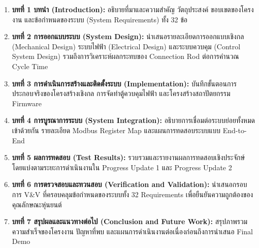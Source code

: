 \begin{enumerate}
    \item \textbf{บทที่ 1 บทนำ (Introduction):} อธิบายที่มาและความสำคัญ วัตถุประสงค์ ขอบเขตของโครงงาน และข้อกำหนดของระบบ (System Requirements) ทั้ง 32 ข้อ
    \item \textbf{บทที่ 2 การออกแบบระบบ (System Design):} นำเสนอรายละเอียดการออกแบบเชิงกล (Mechanical Design) ระบบไฟฟ้า (Electrical Design) และระบบควบคุม (Control System Design) รวมถึงการวิเคราะห์ผลกระทบของ Connection Rod ต่อการคำนวณ Cycle Time
    \item \textbf{บทที่ 3 การดำเนินการสร้างและติดตั้งระบบ (Implementation):} บันทึกขั้นตอนการประกอบจริงของโครงสร้างเชิงกล การจัดทำตู้ควบคุมไฟฟ้า และโครงสร้างสถาปัตยกรรม Firmware
    \item \textbf{บทที่ 4 การบูรณาการระบบ (System Integration):} อธิบายการเชื่อมต่อระบบย่อยทั้งหมดเข้าด้วยกัน รายละเอียด Modbus Register Map และแผนการทดสอบระบบแบบ End-to-End
    \item \textbf{บทที่ 5 ผลการทดสอบ (Test Results):} รวบรวมและรายงานผลการทดสอบเชิงประจักษ์ โดยแบ่งตามระยะการดำเนินงานใน Progress Update 1 และ Progress Update 2
    \item \textbf{บทที่ 6 การตรวจสอบและทวนสอบ (Verification and Validation):} นำเสนอกรอบการ V\&V ที่ครอบคลุมข้อกำหนดของระบบทั้ง 32 Requirements เพื่อยืนยันความถูกต้องของคุณลักษณะหุ่นยนต์
    \item \textbf{บทที่ 7 สรุปผลและแนวทางต่อไป (Conclusion and Future Work):} สรุปภาพรวมความสำเร็จของโครงงาน ปัญหาที่พบ และแผนการดำเนินงานต่อเนื่องก่อนถึงการนำเสนอ Final Demo
\end{enumerate}




